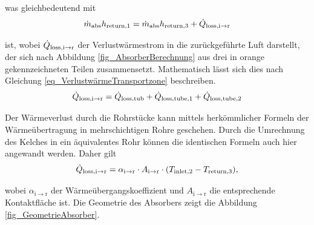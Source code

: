 \vspace*{-\baselineskip}was gleichbedeutend mit
\begin{equation} \label{eq_EnergiebilanzTransportzone2}
    \dot{m}_{\mathrm{abs}}h_{\mathrm{return,}1} = \dot{m}_{\mathrm{abs}}h_{\mathrm{return,}3}+\dot{Q}_{\mathrm{loss,i \to r}}
\end{equation}

\vspace*{-\baselineskip}ist, wobei $\dot{Q}_{\mathrm{loss,i \to r}}$ der Verlustwärmestrom in die zurückgeführte Luft darstellt, der sich nach Abbildung \ref{fig_AbsorberBerechnung} aus drei in orange gekennzeichneten Teilen zusammensetzt.
Mathematisch lässt sich dies nach Gleichung \ref{eq_VerlustwärmeTransportzone} beschreiben.
\begin{equation} \label{eq_VerlustwärmeTransportzone}
    \dot{Q}_{\mathrm{loss,i \to r}} = \dot{Q}_{\mathrm{loss,tub}} + \dot{Q}_{\mathrm{loss,tube,1}} + \dot{Q}_{\mathrm{loss,tube,2}}
\end{equation}

Der Wärmeverlust durch die Rohrstücke kann mittels herkömmlicher Formeln der Wärmeübertragung in mehrschichtigen Rohre geschehen.
Durch die Umrechnung des Kelches in ein äquivalentes Rohr können die identischen Formeln auch hier angewandt werden.
Daher gilt
\begin{equation} \label{eq_VerlustwärmeTransportzone2}
\dot{Q}_{\mathrm{loss,i \to r}}= \alpha_{\mathrm{i\to r}} \cdot A_{\mathrm{i\to r}} \cdot (T_{\mathrm{inlet,}2} - T_{\mathrm{return,}3}),
\end{equation}

\vspace*{-\baselineskip}wobei $\alpha_{\mathrm{i\to r}}$ der Wärmeübergangskoeffizient und $A_{\mathrm{i\to r}}$ die entsprechende Kontaktfläche ist.
Die Geometrie des Absorbers zeigt die Abbildung \ref{fig_GeometrieAbsorber}.

